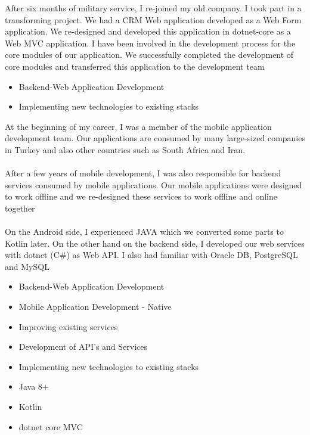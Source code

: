 \documentclass[11pt,a4paper,sans]{moderncv}
\begin{document}
{
	\textnormal
	{
		After six months of military service, I re-joined my old company. I took part in a transforming project. We had a CRM Web application developed as a Web Form application. We re-designed and developed this application in dotnet-core as a Web MVC application. I have been involved in the development process for the core modules of our application. We successfully completed the development of core modules and transferred this application to the development team
	}
	\\
	\begin{itemize}%
		\item Backend-Web Application Development
		\item Implementing new technologies to existing stacks \\
	\end{itemize}
}
{
	\textnormal
	{   
		At the beginning of my career, I was a member of the mobile application development team. Our applications are consumed by many large-sized companies in Turkey and also other countries such as South Africa and Iran.
		\\
		\\
		After a few years of mobile development, I was also responsible for backend services consumed by mobile applications. Our mobile applications were designed to work offline and we re-designed these services to work offline and online together
		\\
		\\
		On the Android side, I experienced JAVA which we converted some parts to Kotlin later. On the other hand on the backend side, I developed our web services with dotnet (C\#) as Web API. I also had familiar with Oracle DB, PostgreSQL and MySQL
	}
	\\
	\begin{itemize}%
		\item Backend-Web Application Development
		\item Mobile Application Development - Native
		\item Improving existing services
		\item Development of API's and Services
		\item Implementing new technologies to existing stacks
		\item Java 8+
		\item Kotlin
		\item dotnet core MVC
	\end{itemize}
}
\pagebreak
\end{document}
